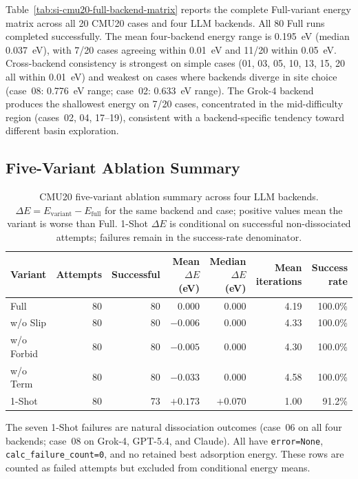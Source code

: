 \documentclass[%
 preprint,
 superscriptaddress,
 amsmath,amssymb,
 aps,
 prb,
 floatfix,
]{revtex4-2}
\begin{document}
Table~\ref{tab:si-cmu20-full-backend-matrix} reports the complete Full-variant energy matrix across all 20 CMU20 cases and four LLM backends. All 80 Full runs completed successfully. The mean four-backend energy range is 0.195~eV (median 0.037~eV), with 7/20 cases agreeing within 0.01~eV and 11/20 within 0.05~eV. Cross-backend consistency is strongest on simple cases (01, 03, 05, 10, 13, 15, 20 all within 0.01~eV) and weakest on cases where backends diverge in site choice (case~08: 0.776~eV range; case~02: 0.633~eV range). The Grok-4 backend produces the shallowest energy on 7/20 cases, concentrated in the mid-difficulty region (cases~02, 04, 17--19), consistent with a backend-specific tendency toward different basin exploration.

\subsection{Five-Variant Ablation Summary}

\begin{table}[ht]
\centering
\scriptsize
\caption{CMU20 five-variant ablation summary across four LLM backends. $\Delta E = E_{\mathrm{variant}} - E_{\mathrm{full}}$ for the same backend and case; positive values mean the variant is worse than Full. 1-Shot $\Delta E$ is conditional on successful non-dissociated attempts; failures remain in the success-rate denominator.}
\label{tab:si-cmu20-ablation-summary}
\begin{tabular}{lrrrrrr}
\toprule
Variant & Attempts & Successful & Mean $\Delta E$ (eV) & Median $\Delta E$ (eV) & Mean iterations & Success rate \\
\midrule
Full & 80 & 80 & 0.000 & 0.000 & 4.19 & 100.0\% \\
w/o Slip & 80 & 80 & $-0.006$ & 0.000 & 4.33 & 100.0\% \\
w/o Forbid & 80 & 80 & $-0.005$ & 0.000 & 4.30 & 100.0\% \\
w/o Term & 80 & 80 & $-0.033$ & 0.000 & 4.58 & 100.0\% \\
1-Shot & 80 & 73 & $+0.173$ & $+0.070$ & 1.00 & 91.2\% \\
\bottomrule
\end{tabular}
\end{table}

The seven 1-Shot failures are natural dissociation outcomes (case~06 on all four backends; case~08 on Grok-4, GPT-5.4, and Claude). All have \texttt{error=None}, \texttt{calc\_failure\_count=0}, and no retained best adsorption energy. These rows are counted as failed attempts but excluded from conditional energy means.
\end{document}
